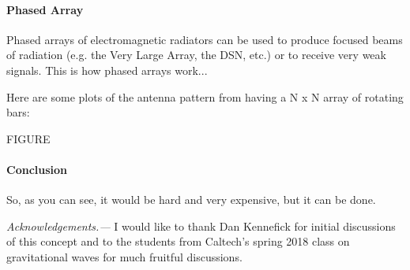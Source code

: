 \documentclass[aps,prl,twocolumn,showpacs,superscriptaddress,groupedaddress]{revtex4-1}  %
\begin{document}
\paragraph{Phased Array}
Phased arrays of electromagnetic radiators can be used to produce focused beams
of radiation (e.g. the Very Large Array, the DSN, etc.) or to receive very weak
signals.
This is how phased arrays work...

Here are some plots of the antenna pattern from having a N x N array of
rotating bars:

FIGURE


\paragraph{Conclusion}
So, as you can see, it would be hard and very expensive, but it can be done.


{\it Acknowledgements.---}
I would like to thank Dan Kennefick for initial discussions of this
concept and to the students from Caltech's spring 2018 class on
gravitational waves for much fruitful discussions.


\end{document}
